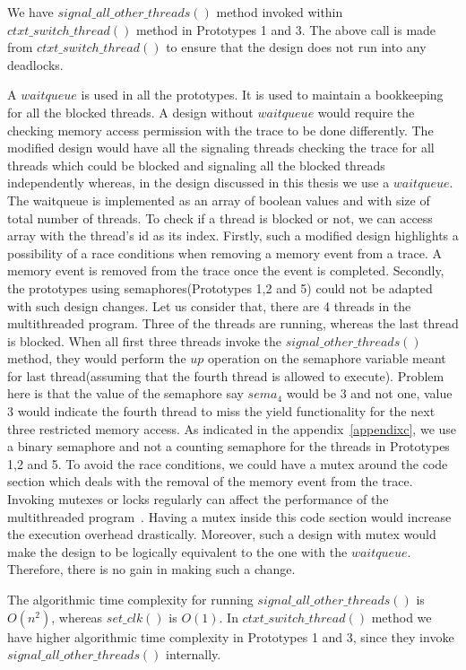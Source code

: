 We have $signal\_all\_other\_threads()$ method invoked within $ctxt\_switch\_thread()$ method in Prototypes 1 and 3. 
The above call is made from $ctxt\_switch\_thread()$ to ensure that the design does not run into any deadlocks. 

A $waitqueue$ is used in all the prototypes. 
It is used to maintain a bookkeeping for all the blocked threads. 
A design without $waitqueue$ would require the checking memory access permission with the trace to be done differently. 
The modified design would have all the signaling threads checking the trace for all threads which could be blocked and signaling all the blocked threads independently whereas, in the design discussed in this thesis we use a $waitqueue$. 
The waitqueue is implemented as an array of boolean values and with size of total number of threads. 
To check if a thread is blocked or not, we can access array with the thread's id as its index. 
Firstly, such a modified design highlights a possibility of a race conditions when removing a memory event from a trace. 
A memory event is removed from the trace once the event is completed. 
Secondly, the prototypes using semaphores(Prototypes 1,2 and 5) could not be adapted with such design changes. 
Let us consider that, there are 4 threads in the multithreaded program. 
Three of the threads are running, whereas the last thread is blocked. 
When all first three threads invoke the $signal\_other\_threads()$ method, they would perform the $up$ operation on the semaphore variable meant for last thread(assuming that the fourth thread is allowed to execute). 
Problem here is that the value of the semaphore say $sema_4$ would be 3 and not one, value 3 would indicate the fourth thread to miss the yield functionality for the next three restricted memory access. 
As indicated in the appendix~\ref{appendixc}, we use a binary semaphore and not a counting semaphore for the threads in Prototypes 1,2 and 5. 
To avoid the race conditions, we could have a mutex around the code section which deals with the removal of the memory event from the trace. 
Invoking mutexes or locks regularly can affect the performance of the multithreaded program~\citep{torrellas1994false}. 
Having a mutex inside this code section would increase the execution overhead drastically. 
Moreover, such a design with mutex would make the design  to be logically equivalent to the one with the $waitqueue$. 
Therefore, there is no gain in making such a change. 

The algorithmic time complexity for running $signal\_all\_other\_threads()$ is $O(n^2)$, whereas $set\_clk()$ is $O(1)$. 
In $ctxt\_switch\_thread()$ method we have higher algorithmic time complexity in Prototypes 1 and 3, since they invoke $signal\_all\_other\_threads()$ internally.